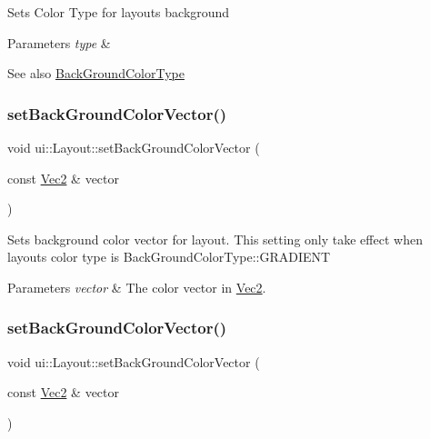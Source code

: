 Sets Color Type for layout\textquotesingle{}s background


\begin{DoxyParams}{Parameters}
{\em type} & \\
\hline
\end{DoxyParams}
\begin{DoxySeeAlso}{See also}
{\ttfamily \hyperlink{classui_1_1Layout_a2aad69f15823c5f22d8ed72bf2ac7472}{Back\+Ground\+Color\+Type}} 
\end{DoxySeeAlso}
\mbox{\label{classui_1_1Layout_aef84038235433bc37df14b05f3a24a6c}} 
\subsubsection{\texorpdfstring{set\+Back\+Ground\+Color\+Vector()}{setBackGroundColorVector()}\hspace{0.1cm}{\footnotesize\ttfamily [1/2]}}
{\footnotesize\ttfamily void ui\+::\+Layout\+::set\+Back\+Ground\+Color\+Vector (\begin{DoxyParamCaption}\item[{const \hyperlink{classVec2}{Vec2} \&}]{vector }\end{DoxyParamCaption})}

Sets background color vector for layout. This setting only take effect when layout\textquotesingle{}s color type is Back\+Ground\+Color\+Type\+::\+G\+R\+A\+D\+I\+E\+NT


\begin{DoxyParams}{Parameters}
{\em vector} & The color vector in {\ttfamily \hyperlink{classVec2}{Vec2}}. \\
\hline
\end{DoxyParams}
\mbox{\label{classui_1_1Layout_aef84038235433bc37df14b05f3a24a6c}} 
\subsubsection{\texorpdfstring{set\+Back\+Ground\+Color\+Vector()}{setBackGroundColorVector()}\hspace{0.1cm}{\footnotesize\ttfamily [2/2]}}
{\footnotesize\ttfamily void ui\+::\+Layout\+::set\+Back\+Ground\+Color\+Vector (\begin{DoxyParamCaption}\item[{const \hyperlink{classVec2}{Vec2} \&}]{vector }\end{DoxyParamCaption})}

